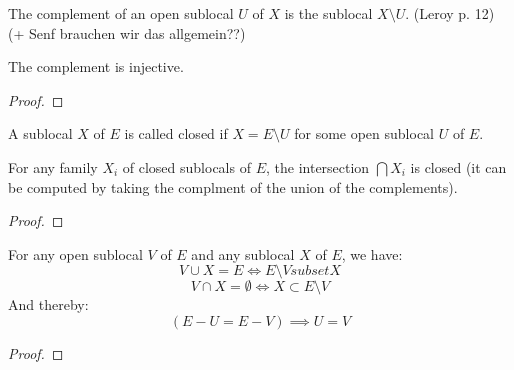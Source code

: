 \begin{definition}[Complement]
    \label{def:complement}
    \leanok
    The complement of an open sublocal $U$ of $X$ is the sublocal $X \setminus U$.
    (Leroy p. 12) (+ Senf brauchen wir das allgemein??)
\end{definition}

\begin{lemma}
    \label{lem:complement_injective}
    \leanok
    The complement is injective.
\end{lemma}
\begin{proof}
    \leanok
\end{proof}

\begin{definition}
    \label{def:closed_sublocal}
    \leanok
    A sublocal $X$ of $E$ is called closed if $X = E \setminus U$ for some open sublocal $U$ of $E$.
\end{definition}

\begin{lemma}
    \label{lem:closed_intersection}
    \leanok
    For any family $X_i$ of closed sublocals of $E$, the intersection $\bigcap X_i$ is closed (it can be computed by
    taking the complment of the union of the complements).
\end{lemma}
\begin{proof}
    \leanok
\end{proof}


\begin{lemma}
    \label{lem:properties_of_complements}
    \leanok
    For any open sublocal $V$ of $E$ and any sublocal $X$ of $E$, we have:
    \[V \cup X = E \iff E \setminus V subset X\]
    \[V \cap X = \emptyset \iff X \subset E \setminus V\]
    And thereby:
    \[(E - U = E - V) \implies U = V\]
\end{lemma}
\begin{proof}
    \leanok
\end{proof}

\begin{comment}
\begin{lemma}[(1.9) Preimage of complements]
    \label{lem:preimage_of_complements}
    \uses{def:complement,lem:properties_of_complements}
    For any morphism of spaces $g: A \to E$ and any open sublocal $V$ of $F$, we have:
    \[g^{-1}(E - V) = A - g^{-1}(V)\]
\end{lemma}
\end{comment}

